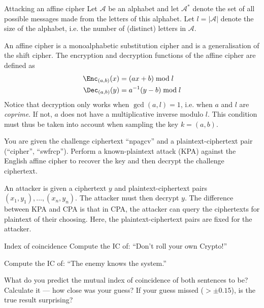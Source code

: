 \documentclass{practice}
\begin{document}
\begin{task}{Attacking an affine cipher}
  Let $\mathcal{A}$ be an alphabet and let $\mathcal{A}^*$ denote the set of all possible messages made from the letters of this alphabet.
  Let $l = \lvert\mathcal{A}\rvert$ denote the size of the alphabet, i.e. the number of (distinct) letters in $\mathcal{A}$.

  An affine cipher is a monoalphabetic substitution cipher and is a generalisation of the shift cipher.
  The encryption and decryption functions of the affine cipher are defined as
  \begin{align*}
    \Enc_{(a, b)}(x) &= (ax + b) \bmod l\\
    \Dec_{(a,b)}(y) &= a^{-1}(y - b) \bmod l
  \end{align*}
  Notice that decryption only works when $\gcd(a, l) = 1$, i.e. when $a$ and $l$ are \emph{coprime}.
  If not, $a$ does not have a multiplicative inverse modulo $l$.
  This condition must thus be taken into account when sampling the key $k=(a,b)$.

  You are given the challenge ciphertext \enquote{npagcv} and a plaintext-ciphertext pair (\enquote{cipher}, \enquote{swfrcp}).
  Perform a known-plaintext attack (KPA) against the English affine cipher to recover the key and then decrypt the challenge ciphertext.

  \begin{tcolorbox}[title=KPA]
    An attacker is given a ciphertext $y$ and plaintext-ciphertext pairs $(x_1, y_1), \dots, (x_n, y_n)$.
    The attacker must then decrypt $y$.
    \tcblower
    The difference between KPA and CPA is that in CPA, the attacker can query the ciphertexts for plaintext of their choosing.
    Here, the plaintext-ciphertext pairs are fixed for the attacker.
  \end{tcolorbox}
\end{task}

\begin{task}{Index of coincidence}
  Compute the IC of:
  \enquote{Don't roll your own Crypto!}

  Compute the IC of: \enquote{The enemy knows the system.}

  What do you predict the mutual index of coincidence of both sentences to be?
  Calculate it --- how close was your guess?
  If your guess missed ($> \pm 0.15$), is the true result surprising?
\end{task}
\end{document}
